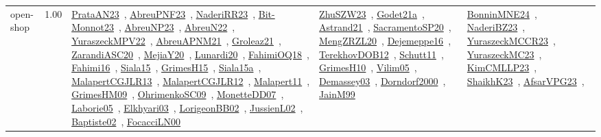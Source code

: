 {\begin{longtable}{p{3cm}r>{\raggedright\arraybackslash}p{6cm}>{\raggedright\arraybackslash}p{6cm}>{\raggedright\arraybackslash}p{8cm}}
\index{open-shop}\index{Concepts!open-shop}open-shop &  1.00 & \href{../works/PrataAN23.pdf}{PrataAN23}~\cite{PrataAN23}, \href{../works/AbreuPNF23.pdf}{AbreuPNF23}~\cite{AbreuPNF23}, \href{../works/NaderiRR23.pdf}{NaderiRR23}~\cite{NaderiRR23}, \href{../works/Bit-Monnot23.pdf}{Bit-Monnot23}~\cite{Bit-Monnot23}, \href{../works/AbreuNP23.pdf}{AbreuNP23}~\cite{AbreuNP23}, \href{../works/AbreuN22.pdf}{AbreuN22}~\cite{AbreuN22}, \href{../works/YuraszeckMPV22.pdf}{YuraszeckMPV22}~\cite{YuraszeckMPV22}, \href{../works/AbreuAPNM21.pdf}{AbreuAPNM21}~\cite{AbreuAPNM21}, \href{../works/Groleaz21.pdf}{Groleaz21}~\cite{Groleaz21}, \href{../works/ZarandiASC20.pdf}{ZarandiASC20}~\cite{ZarandiASC20}, \href{../works/MejiaY20.pdf}{MejiaY20}~\cite{MejiaY20}, \href{../works/Lunardi20.pdf}{Lunardi20}~\cite{Lunardi20}, \href{../works/FahimiOQ18.pdf}{FahimiOQ18}~\cite{FahimiOQ18}, \href{../works/Fahimi16.pdf}{Fahimi16}~\cite{Fahimi16}, \href{../works/Siala15.pdf}{Siala15}~\cite{Siala15}, \href{../works/GrimesH15.pdf}{GrimesH15}~\cite{GrimesH15}, \href{../works/Siala15a.pdf}{Siala15a}~\cite{Siala15a}, \href{../works/MalapertCGJLR13.pdf}{MalapertCGJLR13}~\cite{MalapertCGJLR13}, \href{../works/MalapertCGJLR12.pdf}{MalapertCGJLR12}~\cite{MalapertCGJLR12}, \href{../works/Malapert11.pdf}{Malapert11}~\cite{Malapert11}, \href{../works/GrimesHM09.pdf}{GrimesHM09}~\cite{GrimesHM09}, \href{../works/OhrimenkoSC09.pdf}{OhrimenkoSC09}~\cite{OhrimenkoSC09}, \href{../works/MonetteDD07.pdf}{MonetteDD07}~\cite{MonetteDD07}, \href{../works/Laborie05.pdf}{Laborie05}~\cite{Laborie05}, \href{../works/Elkhyari03.pdf}{Elkhyari03}~\cite{Elkhyari03}, \href{../works/LorigeonBB02.pdf}{LorigeonBB02}~\cite{LorigeonBB02}, \href{../works/JussienL02.pdf}{JussienL02}~\cite{JussienL02}, \href{../works/Baptiste02.pdf}{Baptiste02}~\cite{Baptiste02}, \href{../works/FocacciLN00.pdf}{FocacciLN00}~\cite{FocacciLN00} & \href{../works/ZhuSZW23.pdf}{ZhuSZW23}~\cite{ZhuSZW23}, \href{../works/Godet21a.pdf}{Godet21a}~\cite{Godet21a}, \href{../works/Astrand21.pdf}{Astrand21}~\cite{Astrand21}, \href{../works/SacramentoSP20.pdf}{SacramentoSP20}~\cite{SacramentoSP20}, \href{../works/MengZRZL20.pdf}{MengZRZL20}~\cite{MengZRZL20}, \href{../works/Dejemeppe16.pdf}{Dejemeppe16}~\cite{Dejemeppe16}, \href{../works/TerekhovDOB12.pdf}{TerekhovDOB12}~\cite{TerekhovDOB12}, \href{../works/Schutt11.pdf}{Schutt11}~\cite{Schutt11}, \href{../works/GrimesH10.pdf}{GrimesH10}~\cite{GrimesH10}, \href{../works/Vilim05.pdf}{Vilim05}~\cite{Vilim05}, \href{../works/Demassey03.pdf}{Demassey03}~\cite{Demassey03}, \href{../works/Dorndorf2000.pdf}{Dorndorf2000}~\cite{Dorndorf2000}, \href{../works/JainM99.pdf}{JainM99}~\cite{JainM99} & \href{../works/BonninMNE24.pdf}{BonninMNE24}~\cite{BonninMNE24}, \href{../works/NaderiBZ23.pdf}{NaderiBZ23}~\cite{NaderiBZ23}, \href{../works/YuraszeckMCCR23.pdf}{YuraszeckMCCR23}~\cite{YuraszeckMCCR23}, \href{../works/YuraszeckMC23.pdf}{YuraszeckMC23}~\cite{YuraszeckMC23}, \href{../works/KimCMLLP23.pdf}{KimCMLLP23}~\cite{KimCMLLP23}, \href{../works/ShaikhK23.pdf}{ShaikhK23}~\cite{ShaikhK23}, \href{../works/AfsarVPG23.pdf}{AfsarVPG23}~\cite{AfsarVPG23}, 
\end{longtable}}
